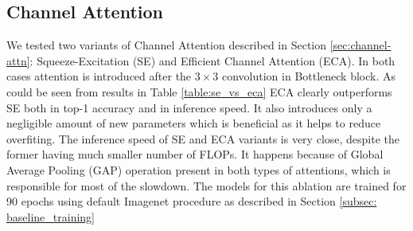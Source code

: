 \subsection{Channel Attention}
We tested two variants of Channel Attention described in Section \ref{sec:channel-attn}: Squeeze-Excitation (SE) and Efficient Channel Attention (ECA). In both cases attention is introduced after the $3 \times 3$ convolution in Bottleneck block. As could be seen from results in Table \ref{table:se_vs_eca} ECA clearly outperforms SE both in top-1 accuracy and in inference speed. It also introduces only a negligible amount of new parameters which is beneficial as it helps to reduce overfiting. The inference speed of SE and ECA variants is very close, despite the former having much smaller number of FLOPs. It happens because of Global Average Pooling (GAP) operation present in both types of attentions, which is responsible for most of the slowdown. The models for this ablation are trained for 90 epochs using default Imagenet procedure as described in Section \ref{subsec: baseline_training}






